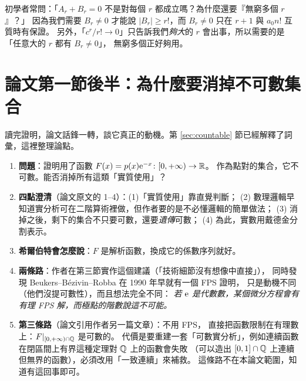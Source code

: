 \begin{warnbox}
初學者常問：「$A_r+B_r=0$ 不是對每個 $r$ 都成立嗎？為什麼還要『無窮多個 $r$』？」
因為我們需要 $B_r\neq0$ 才能說 $|B_r|\ge r!$，而 $B_r\neq0$ 只在 $r+1$ 與 $a_0n!$ 互質時有保證。
另外，「$c^r/r!\to0$」只告訴我們\emph{夠大}的 $r$ 會出事，所以需要的是「任意大的 $r$ 都有 $B_r\ne0$」，
無窮多個正好夠用。
\end{warnbox}

\section{論文第一節後半：為什麼要消掉不可數集合}\label{sec:why-countable}

讀完證明，論文話鋒一轉，談它真正的動機。第 \ref{sec:countable} 節已經解釋了詞彙，這裡整理論點。

\begin{enumerate}
  \item \textbf{問題}：證明用了函數 $F(x)=p(x)\mathrm{e}^{-x}\colon[0,+\infty)\to\mathbb{R}$。
        作為點對的集合，它不可數。能否消掉所有這類「實質使用」？
  \item \textbf{四點澄清}（論文原文的 1--4）：(1)「實質使用」靠直覺判斷；
        (2) 數理邏輯早知道實分析可在二階算術裡做，但作者要的是不必懂邏輯的簡單做法；
        (3) 消掉之後，剩下的集合不只要可數，還要\emph{遺傳}可數；
        (4) 為此，實數用戴德金分割表示。
  \item \textbf{希爾伯特會怎麼說}：$F$ 是解析函數，換成它的係數序列就好。
  \item \textbf{兩條路}：作者在第三節實作這個建議（「技術細節沒有想像中直接」），
        同時發現 Beukers--Bézivin--Robba 在 1990 年早就有一個 FPS 證明，
        只是動機不同（他們沒提可數性），而且想法完全不同：
        \emph{若 $\mathrm{e}$ 是代數數，某個微分方程會有有理 FPS 解，而極點的階數說這不可能。}
  \item \textbf{第三條路}（論文引用作者另一篇文章）：不用 FPS，
        直接把函數限制在有理數上：$F|_{[0,+\infty)\cap\mathbb{Q}}$ 是可數的。
        代價是要重建一套「可數實分析」，例如連續函數在閉區間上有界這種定理對 $\mathbb{Q}$ 上的函數會失敗
        （可以造出 $[0,1]\cap\mathbb{Q}$ 上連續但無界的函數），必須改用「一致連續」來補救。
        這條路不在本論文範圍，知道有這回事即可。
\end{enumerate}
